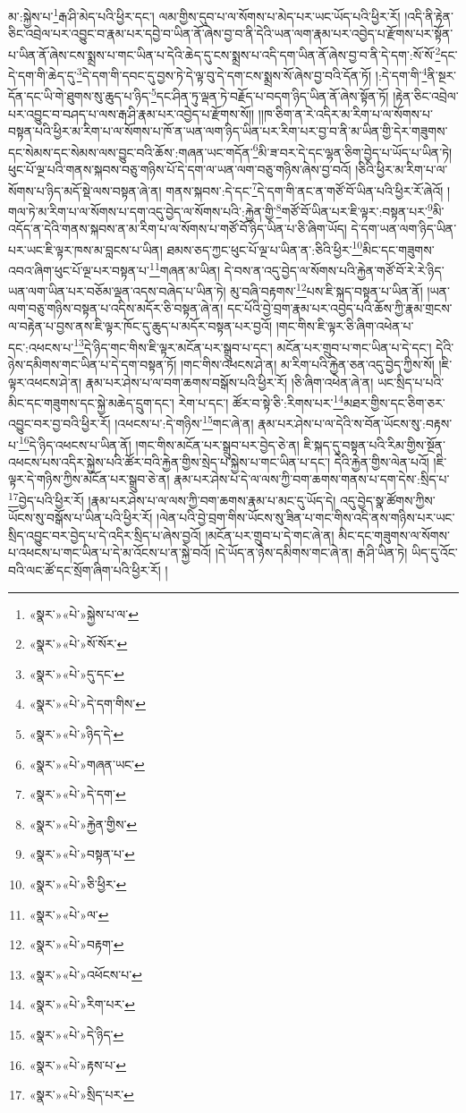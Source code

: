 མ་:སྐྱེས་པ་\footnote{«སྣར་»«པེ་»སྐྱེས་པ་ལ་}རྒ་ཤི་མེད་པའི་ཕྱིར་དང་། ལམ་གྱིས་དུབ་པ་ལ་སོགས་པ་མེད་པར་ཡང་ཡོད་པའི་ཕྱིར་རོ། །འདི་ནི་རྟེན་ཅིང་འབྲེལ་པར་འབྱུང་བ་རྣམ་པར་དབྱེ་བ་ཡིན་ནོ་ཞེས་བྱ་བ་ནི་དེའི་ཡན་ལག་རྣམ་པར་འབྱེད་པ་རྫོགས་པར་སྟོན་པ་ཡིན་ནོ་ཞེས་ངས་སྨྲས་པ་གང་ཡིན་པ་དེའི་ཆེད་དུ་ངས་སྨྲས་པ་འདི་དག་ཡིན་ནོ་ཞེས་བྱ་བ་ནི་དེ་དག་:སོ་སོ་\footnote{«སྣར་»«པེ་»སོ་སོར་}དང་དེ་དག་གི་ཆེད་དུ་\footnote{«སྣར་»«པེ་»དུ་དང་}དེ་དག་གི་དབང་དུ་བྱས་ཏེ་དེ་ལྟ་བུ་དེ་དག་ངས་སྨྲས་སོ་ཞེས་བྱ་བའི་དོན་ཏོ། །:དེ་དག་གི་\footnote{«སྣར་»«པེ་»དེ་དག་གིས་}ནི་སྔར་དོན་དང་ཡི་གེ་ཐུགས་སུ་ཆུད་པ་ཉིད་\footnote{«སྣར་»«པེ་»ཉིད་དེ་}དང་ཤིན་ཏུ་ལྡན་ཏེ་བརྗོད་པ་བདག་ཉིད་ཡིན་ནོ་ཞེས་སྟོན་ཏོ། །རྟེན་ཅིང་འབྲེལ་པར་འབྱུང་བ་བཤད་པ་ལས་རྒ་ཤི་རྣམ་པར་འབྱེད་པ་རྫོགས་སོ།། །།ཁ་ཅིག་ན་རེ་འདིར་མ་རིག་པ་ལ་སོགས་པ་བསྟན་པའི་ཕྱིར་མ་རིག་པ་ལ་སོགས་པ་ཁོ་ན་ཡན་ལག་ཉིད་ཡིན་པར་རིག་པར་བྱ་བ་ནི་མ་ཡིན་གྱི་དེར་གཟུགས་དང་སེམས་དང་སེམས་ལས་བྱུང་བའི་ཆོས་:གཞན་ཡང་གདོན་\footnote{«སྣར་»«པེ་»གཞན་ཡང་}མི་ཟ་བར་དེ་དང་ལྷན་ཅིག་བྱེད་པ་ཡོད་པ་ཡིན་ཏེ། ཕུང་པོ་ལྔ་པའི་གནས་སྐབས་བཅུ་གཉིས་པོ་དེ་དག་ལ་ཡན་ལག་བཅུ་གཉིས་ཞེས་བྱ་བའོ། །ཅིའི་ཕྱིར་མ་རིག་པ་ལ་སོགས་པ་ཉིད་མདོ་སྡེ་ལས་བསྟན་ཞེ་ན། གནས་སྐབས་:དེ་དང་\footnote{«སྣར་»«པེ་»དེ་དག་}དེ་དག་གི་ནང་ན་གཙོ་བོ་ཡིན་པའི་ཕྱིར་རོ་ཞེའོ། །གལ་ཏེ་མ་རིག་པ་ལ་སོགས་པ་དག་འདུ་བྱེད་ལ་སོགས་པའི་:རྐྱེན་གྱི་\footnote{«སྣར་»«པེ་»རྐྱེན་གྱིས་}གཙོ་བོ་ཡིན་པར་ཇི་ལྟར་:བསྟན་པར་\footnote{«སྣར་»«པེ་»བསྟན་པ་}མི་འདོད་ན་དེའི་གནས་སྐབས་ན་མ་རིག་པ་ལ་སོགས་པ་གཙོ་བོ་ཉིད་ཡིན་པ་ཅི་ཞིག་ཡོད། དེ་དག་ཡན་ལག་ཉིད་ཡིན་པར་ཡང་ཇི་ལྟར་ཁས་མ་བླངས་པ་ཡིན། ཐམས་ཅད་ཀྱང་ཕུང་པོ་ལྔ་པ་ཡིན་ན་:ཅིའི་ཕྱིར་\footnote{«སྣར་»«པེ་»ཅི་ཕྱིར་}མིང་དང་གཟུགས་འབའ་ཞིག་ཕུང་པོ་ལྔ་པར་བསྟན་པ་\footnote{«སྣར་»«པེ་»ལ་}གཞན་མ་ཡིན། དེ་བས་ན་འདུ་བྱེད་ལ་སོགས་པའི་རྐྱེན་གཙོ་བོ་རེ་རེ་ཉིད་ཡན་ལག་ཡིན་པར་བཅོམ་ལྡན་འདས་བཞེད་པ་ཡིན་ཏེ། མུ་བཞི་བརྟགས་\footnote{«སྣར་»«པེ་»བརྟག་}པས་ཇི་སྐད་བསྟན་པ་ཡིན་ནོ། །ཡན་ལག་བཅུ་གཉིས་བསྟན་པ་འདིས་མདོར་ཅི་བསྟན་ཞེ་ན། དང་པོའི་བྱེ་བྲག་རྣམ་པར་འབྱེད་པའི་ཆོས་ཀྱི་རྣམ་གྲངས་ལ་བརྟེན་པ་བྱས་ནས་ཇི་ལྟར་ཁོང་དུ་ཆུད་པ་མདོར་བསྟན་པར་བྱའོ། །གང་གིས་ཇི་ལྟར་ཅི་ཞིག་འཕེན་པ་དང་:འཕངས་པ་\footnote{«སྣར་»«པེ་»འཕོངས་པ་}དེ་ཉིད་གང་གིས་ཇི་ལྟར་མངོན་པར་སྒྲུབ་པ་དང་། མངོན་པར་གྲུབ་པ་གང་ཡིན་པ་དེ་དང་། དེའི་ཉེས་དམིགས་གང་ཡིན་པ་དེ་དག་བསྟན་ཏོ། །གང་གིས་འཕངས་ཤེ་ན། མ་རིག་པའི་རྐྱེན་ཅན་འདུ་བྱེད་ཀྱིས་སོ། །ཇི་ལྟར་འཕངས་ཤེ་ན། རྣམ་པར་ཤེས་པ་ལ་བག་ཆགས་བསྒོས་པའི་ཕྱིར་རོ། །ཅི་ཞིག་འཕེན་ཞེ་ན། ཡང་སྲིད་པ་པའི་མིང་དང་གཟུགས་དང་སྐྱེ་མཆེད་དྲུག་དང་། རེག་པ་དང་། ཚོར་བ་སྟེ་ཅི་:རིགས་པར་\footnote{«སྣར་»«པེ་»རིག་པར་}མཐར་གྱིས་དང་ཅིག་ཅར་འབྱུང་བར་བྱ་བའི་ཕྱིར་རོ། །འཕངས་པ་:དེ་གཉིས་\footnote{«སྣར་»«པེ་»དེ་ཉིད་}གང་ཞེ་ན། རྣམ་པར་ཤེས་པ་ལ་དེའི་ས་བོན་ཡོངས་སུ་:བརྟས་པ་\footnote{«སྣར་»«པེ་»རྟས་པ་}དེ་ཉིད་འཕངས་པ་ཡིན་ནོ། །གང་གིས་མངོན་པར་སྒྲུབ་པར་བྱེད་ཅེ་ན། ཇི་སྐད་དུ་བསྟན་པའི་རིམ་གྱིས་སྔོན་འཕངས་པས་འདིར་སྐྱེས་པའི་ཚོར་བའི་རྐྱེན་གྱིས་སྲེད་པ་སྐྱེས་པ་གང་ཡིན་པ་དང་། དེའི་རྐྱེན་གྱིས་ལེན་པའོ། །ཇི་ལྟར་དེ་གཉིས་ཀྱིས་མངོན་པར་སྒྲུབ་ཅེ་ན། རྣམ་པར་ཤེས་པ་དེ་ལ་ལས་ཀྱི་བག་ཆགས་གནས་པ་དག་དེས་:སྲིད་པ་\footnote{«སྣར་»«པེ་»སྲིད་པར་}བྱེད་པའི་ཕྱིར་རོ། །རྣམ་པར་ཤེས་པ་ལ་ལས་ཀྱི་བག་ཆགས་རྣམ་པ་མང་དུ་ཡོད་དེ། འདུ་བྱེད་སྣ་ཚོགས་ཀྱིས་ཡོངས་སུ་བསྒོས་པ་ཡིན་པའི་ཕྱིར་རོ། །ལེན་པའི་བྱེ་བྲག་གིས་ཡོངས་སུ་ཟིན་པ་གང་གིས་འདི་ནས་གཉིས་པར་ཡང་སྲིད་འབྱུང་བར་བྱེད་པ་དེ་འདིར་སྲིད་པ་ཞེས་བྱའོ། །མངོན་པར་གྲུབ་པ་དེ་གང་ཞེ་ན། མིང་དང་གཟུགས་ལ་སོགས་པ་འཕངས་པ་གང་ཡིན་པ་དེ་མ་འོངས་པ་ན་སྐྱེ་བའོ། །དེ་ཡོད་ན་ཉེས་དམིགས་གང་ཞེ་ན། རྒ་ཤི་ཡིན་ཏེ། ཡིད་དུ་འོང་བའི་ལང་ཚོ་དང་སྲོག་ཞིག་པའི་ཕྱིར་རོ། །
